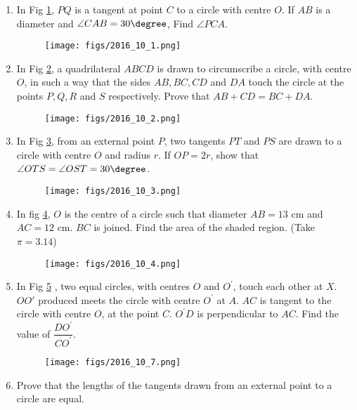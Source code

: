 \begin{enumerate}
\item In Fig \ref{figure_2}, $PQ$ is a tangent at point $C$ to a circle with centre $O$. If $AB$ is a diameter and $\angle CAB = 30\degree $, Find $\angle PCA$.\\
\begin{figure}[H]
\centering
	\texttt{[image: figs/2016\_10\_1.png]}
	\caption{}
\label{figure_2}
\end{figure} 
\item  In Fig \ref{figure_3}, a quadrilateral $ABCD$ is drawn to circumscribe a circle, with centre $O$, in such a way that the sides $AB, BC, CD$ and $DA$ touch the circle at the points $P, Q, R$ and $S$ respectively. Prove that $ AB + CD= BC + DA $.\\
	\begin{figure}[H]
\centering
      \texttt{[image: figs/2016\_10\_2.png]}
      \caption{}
      \label{figure_3}
\end{figure} 
\item  In Fig \ref{figure_4}, from an external point $P$, two tangents $PT$ and $PS$ are drawn to a circle with centre $O$ and radius $r$. If $OP = 2r$, show that $\angle OTS = \angle OST= 30\degree$.
\begin{figure}[H]
\centering
\texttt{[image: figs/2016\_10\_3.png]}
\caption{}
      \label{figure_4}
   \end{figure} 
 \item  In fig \ref{figure_5}, $O$ is the centre of a circle such that diameter $AB = 13$ cm and $AC = 12$ cm. $BC$ is joined. Find the area of the shaded region. (Take $\pi = 3.14$)\\

	\begin{figure}[H]
      \centering
      \texttt{[image: figs/2016\_10\_4.png]}
      \caption{}
      \label{figure_5}
\end{figure} 
\item In Fig \ref{figure_6} , two equal circles, with centres $O$ and $O^\prime$, touch each other at $X$.$OO\prime$ produced meets the circle with centre $O^\prime$ at $A$. $AC$ is tangent to the circle with centre $O$, at the point $C$. $O^\prime D$ is perpendicular to $AC$. Find the value of $\dfrac{DO^\prime}{CO^\prime}$.\\
	\begin{figure}[H]
      \centering
      \texttt{[image: figs/2016\_10\_7.png]}
      \caption{}
      \label{figure_6}
   \end{figure} 
 
\item Prove that the lengths of the tangents drawn from an external point to a circle are equal.

\end{enumerate}
